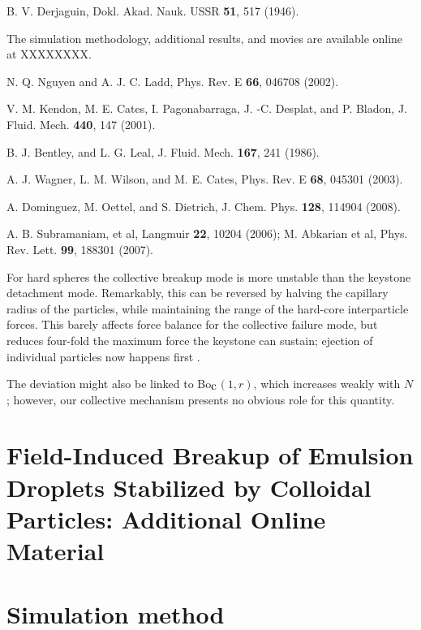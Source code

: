\documentclass[aps,prl,superscriptaddress,twocolumn,showpacs,floatfix]{revtex4-1}
\newcommand{\Bocm}{Bo$_{\hbox{\rm c}}$}
\begin{document}
\begin{thebibliography}{100}
B. V. Derjaguin, Dokl. Akad. Nauk. USSR  \textbf{51}, 517 (1946).

 The simulation methodology, additional results, and movies are available online at XXXXXXXX.

 N. Q. Nguyen and A. J. C. Ladd, Phys. Rev. E \textbf{66}, 046708 (2002).

V. M. Kendon, M. E. Cates, I. Pagonabarraga, J. -C. Desplat, and P. Bladon, J. Fluid. Mech. \textbf{440}, 147 (2001).
  
B. J. Bentley, and L. G. Leal, J. Fluid. Mech. \textbf{167}, 241 (1986).  

A. J. Wagner, L. M. Wilson, and M. E. Cates, Phys. Rev. E \textbf{68}, 045301 (2003).

A. Dominguez, M. Oettel, and S. Dietrich, J. Chem. Phys. \textbf{128}, 114904 (2008).

 A. B. Subramaniam, et al, 
Langmuir \textbf{22}, 10204 (2006); M. Abkarian et al, Phys. Rev. Lett. \textbf{99}, 188301 (2007).

 For hard spheres the collective breakup mode is more unstable than the keystone detachment mode. Remarkably, this can be reversed by halving the capillary radius of the particles, while maintaining the range of the hard-core interparticle forces. This barely affects force balance for the collective failure mode, but reduces four-fold the maximum force the keystone can sustain; ejection of individual particles now happens first \cite{supmat}.

 The deviation might also be linked to \Bocm $(1,r)$, which increases weakly with $N$; however, our collective mechanism presents no obvious role for this quantity.


\end{thebibliography}

\newpage

\section{Field-Induced Breakup of Emulsion Droplets Stabilized by Colloidal
Particles: Additional Online Material}

\section{Simulation method} \label{method}
\end{document}
